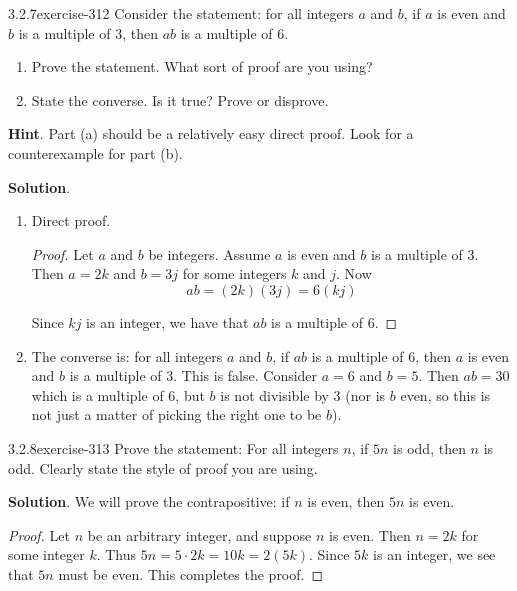 \documentclass[twoside,11pt,]{book}
\numberwithin{equation}{chapter}
\begin{document}
\begin{divisionsolution}{3.2.7}{}{exercise-312}%
\hypertarget{p-4146}{}%
Consider the statement: for all integers \(a\) and \(b\), if \(a\) is even and \(b\) is a multiple of 3, then \(ab\) is a multiple of 6.\leavevmode%
\begin{enumerate}[label=(\alph*)]
\item\hypertarget{li-2137}{}\hypertarget{p-4147}{}%
Prove the statement. What sort of proof are you using?%
\item\hypertarget{li-2138}{}\hypertarget{p-4148}{}%
State the converse. Is it true? Prove or disprove.%
\end{enumerate}
%
\par\smallskip%
\noindent\textbf{Hint}.\quad%
\hypertarget{p-4149}{}%
Part (a) should be a relatively easy direct proof.  Look for a counterexample for part (b).%
\par\smallskip%
\noindent\textbf{Solution}.\quad%
\leavevmode%
\begin{enumerate}[label=(\alph*)]
\item\hypertarget{li-2139}{}\hypertarget{p-4150}{}%
Direct proof. \begin{proof}{}
\hypertarget{p-4151}{}%
Let \(a\) and \(b\) be integers. Assume \(a\) is even and \(b\) is a multiple of 3. Then \(a = 2k\) and \(b = 3j\) for some integers \(k\) and \(j\). Now%
\begin{equation*}
ab = (2k)(3j) = 6(kj)
\end{equation*}
%
\par
\hypertarget{p-4152}{}%
Since \(kj\) is an integer, we have that \(ab\) is a multiple of 6.%
\end{proof}
%
\item\hypertarget{li-2140}{}\hypertarget{p-4153}{}%
The converse is: for all integers \(a\) and \(b\), if \(ab\) is a multiple of 6, then \(a\) is even and \(b\) is a multiple of 3. This is false. Consider \(a = 6\) and \(b = 5\). Then \(ab = 30\) which is a multiple of 6, but \(b\) is not divisible by 3 (nor is \(b\) even, so this is not just a matter of picking the right one to be \(b\)).%
\end{enumerate}
\end{divisionsolution}%
\begin{divisionsolution}{3.2.8}{}{exercise-313}%
\hypertarget{p-4154}{}%
Prove the statement: For all integers \(n\), if \(5n\) is odd, then \(n\) is odd. Clearly state the style of proof you are using.%
\par\smallskip%
\noindent\textbf{Solution}.\quad%
\hypertarget{p-4155}{}%
We will prove the contrapositive: if \(n\) is even, then \(5n\) is even.%
\begin{proof}{}
\hypertarget{p-4156}{}%
Let \(n\) be an arbitrary integer, and suppose \(n\) is even. Then \(n = 2k\) for some integer \(k\). Thus \(5n = 5\cdot 2k = 10k = 2(5k)\). Since \(5k\) is an integer, we see that \(5n\) must be even. This completes the proof.%
\end{proof}
\end{divisionsolution}%
\end{document}

